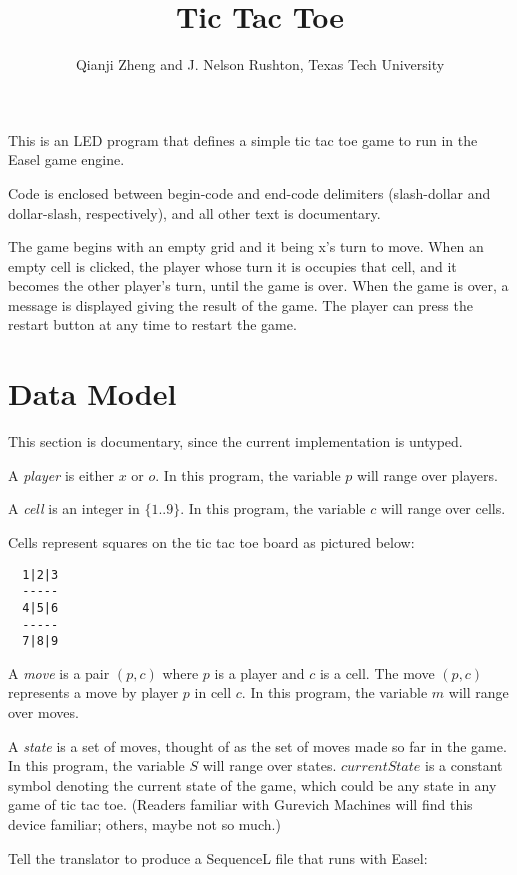 \documentclass{../lib}
\begin{document}
\begin{ledCmnt}
\title{Tic Tac Toe}
\date{}
\author{Qianji Zheng and J. Nelson Rushton, Texas Tech University}
\maketitle

This is an LED program that defines a simple tic tac toe game to run in the Easel game engine.

Code is enclosed between begin-code and end-code delimiters (slash-dollar and dollar-slash, respectively), and all other text is documentary.

The game begins with an empty grid and it being x's turn to move. When an empty cell is clicked, the player whose turn it is occupies that cell, and it becomes the other player's turn, until the game is over. When the game is over, a message is displayed giving the result of the  game. The player can press the restart button at any time to restart the game.

\section{Data Model}

This section is documentary, since the current implementation is untyped.

A {\em player} is either $x$ or $o$. In this program, the variable $p$ will range over players.

A {\em cell} is an integer in $\{1..9\}$. In this program, the variable $c$ will range over cells.

Cells represent squares on the tic tac toe board as pictured below:
\begin{verbatim}
  1|2|3
  -----
  4|5|6
  -----
  7|8|9
\end{verbatim}

A {\em move} is a pair $(p,c)$ where $p$ is a player and $c$ is a cell. The move $(p,c)$ represents a move by player $p$ in cell $c$. In this program, the variable $m$ will range over moves.

A {\em state} is a set of moves, thought of as the set of moves made so far in the game. In this program, the variable $S$ will range over states. $currentState$ is a constant symbol denoting the current state of the game, which could be any state in any game of tic tac toe. (Readers familiar with Gurevich Machines will find this device familiar; others, maybe not so much.)

Tell the translator to produce a SequenceL file that runs with Easel:
\end{ledCmnt}
\end{document}
